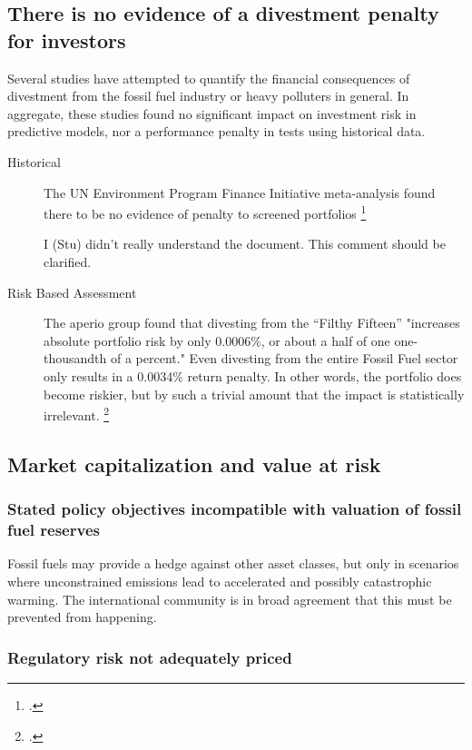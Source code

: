 \subsection {There is no evidence of a divestment penalty for investors}

Several studies have attempted to quantify the financial consequences of divestment from the fossil fuel industry or heavy polluters in general.
In aggregate, these studies found no significant impact on investment risk in predictive models, nor a performance penalty in tests using historical data.
\begin{description}
  \item[Historical] The UN Environment Program Finance Initiative meta-analysis found there to be no evidence of penalty to screened portfolios \footcite{UNEPFI2007}
  \begin{vcom}
    I (Stu) didn't really understand the document. This comment should be clarified.
  \end{vcom}
  \item[Risk Based Assessment] The aperio group found that divesting from the ``Filthy Fifteen'' "increases absolute portfolio risk by only 0.0006\%, or about a half of one one-thousandth of a percent." Even divesting from the entire Fossil Fuel sector only results in a 0.0034\% return penalty. In other words, the portfolio does become riskier, but by such a trivial amount that the impact is statistically irrelevant. \footcite{Aperio2013}
\end{description}


\subsection {Market capitalization and value at risk}

\subsubsection {Stated policy objectives incompatible with valuation of fossil fuel reserves}

Fossil fuels may provide a hedge against other asset classes, but only in scenarios where unconstrained emissions lead to accelerated and possibly catastrophic warming. 
The international community is in broad agreement that this must be prevented from happening.




\subsubsection {Regulatory risk not adequately priced} 



